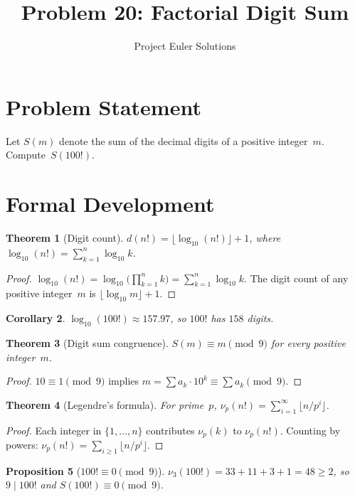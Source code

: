 \documentclass[12pt,a4paper]{article}
\title{Problem 20: Factorial Digit Sum}
\author{Project Euler Solutions}
\date{}
\newtheorem{theorem}{Theorem}
\newtheorem{proposition}[theorem]{Proposition}
\newtheorem{corollary}[theorem]{Corollary}
\theoremstyle{definition}
\begin{document}
\maketitle

\section{Problem Statement}
Let $S(m)$ denote the sum of the decimal digits of a positive integer~$m$. Compute~$S(100!)$.

\section{Formal Development}

\begin{theorem}[Digit count]
$d(n!) = \lfloor \log_{10}(n!) \rfloor + 1$, where
$\log_{10}(n!) = \sum_{k=1}^{n} \log_{10} k$.
\end{theorem}

\begin{proof}
$\log_{10}(n!) = \log_{10}\bigl(\prod_{k=1}^{n} k\bigr) = \sum_{k=1}^{n} \log_{10} k$.
The digit count of any positive integer~$m$ is $\lfloor \log_{10} m \rfloor + 1$.
\end{proof}

\begin{corollary}
$\log_{10}(100!) \approx 157.97$, so $100!$ has $158$ digits.
\end{corollary}

\begin{theorem}[Digit sum congruence]
$S(m) \equiv m \pmod{9}$ for every positive integer~$m$.
\end{theorem}

\begin{proof}
$10 \equiv 1 \pmod{9}$ implies $m = \sum a_k \cdot 10^k \equiv \sum a_k \pmod{9}$.
\end{proof}

\begin{theorem}[Legendre's formula]
For prime~$p$, $\nu_p(n!) = \sum_{i=1}^{\infty} \lfloor n/p^i \rfloor$.
\end{theorem}

\begin{proof}
Each integer in $\{1, \ldots, n\}$ contributes $\nu_p(k)$ to $\nu_p(n!)$.
Counting by powers: $\nu_p(n!) = \sum_{i \ge 1} \lfloor n/p^i \rfloor$.
\end{proof}

\begin{proposition}[$100! \equiv 0 \pmod{9}$]
$\nu_3(100!) = 33 + 11 + 3 + 1 = 48 \ge 2$, so $9 \mid 100!$ and $S(100!) \equiv 0 \pmod{9}$.
\end{proposition}
\end{document}
